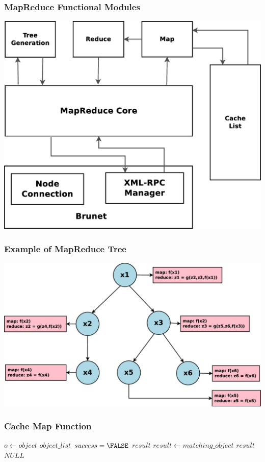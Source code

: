 \documentclass[red]{beamer}
\begin{document}
\begin{frame}
\frametitle{MapReduce Functional Modules}
\begin{center}
\includegraphics[scale=0.2]{figs/mapreduce_query_system}
\end{center}
\end{frame}

\begin{frame}
\frametitle{Example of MapReduce Tree}
\begin{center}
\includegraphics[scale=0.2]{figs/mapreduce_tree}
\end{center}
\end{frame}

\begin{frame}
\frametitle{Cache Map Function}
\begin{algorithmic}[1]
\STATE $o \leftarrow object$     
\STATE $object\_list$ %
\STATE $success = \FALSE$ %
\STATE $result$
  \STATE $result \leftarrow matching\_object$
  \RETURN $result$
\ELSE
  \RETURN $NULL$
\ENDIF
\end{algorithmic}
\end{frame}
\end{document}
